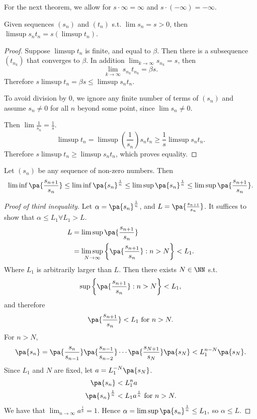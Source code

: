 \documentclass[11pt]{scrartcl}
\numberwithin{equation}{section}
\begin{document}
For the next theorem, we allow for $s\cdot\infty = \infty$
and $s \cdot (-\infty) = -\infty$.

\begin{theorem}
    Given sequences $(s_n)$ and $(t_n)$ s.t. 
    $\lim{s_n}=s>0$,
    then 
    $\limsup{s_nt_n} = s (\limsup t_n)$. 
\end{theorem}

\begin{proof}
    Suppose $\limsup t_n$ is finite, and equal to $\beta$.
    Then there is a subsequence $(t_{n_k})$ that converges to $\beta$.
    In addition $\lim_{k\rightarrow \infty}{s_{n_k}} = s$,
    then \[ \lim_{k\rightarrow \infty}{s_{n_k}t_{n_k}} = \beta s.\]
    Therefore $s\limsup t_n = \beta s\leq \limsup s_nt_n$.
    
    To avoid division by $0$, we ignore any finite number of terms of $(s_n)$ and 
    assume $s_n\neq 0$ for all $n$ beyond some point, since 
    $\lim s_n \neq 0$.

    Then $\lim \frac{1}{s_n} = \frac{1}{s}$. 
    \[ \limsup t_n = \limsup \left(\frac{1}{s_n}\right)s_nt_n \geq \frac{1}{s}\limsup s_nt_n. \]
    Therefore $s\limsup t_n \geq \limsup s_nt_n$, which proves equality.
\end{proof}
\begin{theorem}
    Let $(s_n)$ be any sequence of non-zero numbers. 
    Then 
    \[ \liminf \pa{\frac{s_{n+1}}{s_n}} \leq \liminf \pa{s_n}^{\frac{1}{n}}
    \leq \limsup \pa{s_n}^{\frac{1}{n}}\leq \limsup \pa{\frac{s_{n+1}}{s_n}}.\]
\end{theorem}
\begin{proof}
    [Proof of third inequality]
    Let $\alpha = \pa{s_n}^{\frac{1}{n}}$, and 
    $L = \pa{\frac{s_{n+1}}{s_n}}$.
    It suffices to show that $\alpha \leq L_1 \forall L_1>L.$
    \begin{align*}
        L &= \limsup \pa{\frac{s_{n+1}}{s_n}} \\
        &= \limsup_{N\rightarrow \infty}\left\{\pa{\frac{s_{n+1}}{s_n}} : n > N\right\} < L_1.
    \end{align*}
    Where $L_1$ is arbitrarily larger than $L$. 
    Then there exists $N\in\NN$ s.t. 
    \[ \sup \left\{\pa{\frac{s_{n+1}}{s_n}} : n > N\right\} < L_1,\]
    and therefore 
    \[ \pa{\frac{s_{n+1}}{s_n}} < L_1 \text{ for } n>N.\]
    For $n>N$, 
    \[ \pa{s_n} = \pa{\frac{s_{n}}{s_{n-1}}}\pa{\frac{s_{n-1}}{s_{n-2}}}
    \cdots \pa{\frac{s_{N+1}}{s_N}}\pa{s_N} < L_1^{n-N}\pa{s_N}.\]
    Since $L_1$ and $N$ are fixed, let $a = L_1^{-N}\pa{s_N}$.
    \begin{align*}
        \pa{s_n} &< L_1^na \\
        \pa{s_n}^{\frac{1}{n}} &< L_1a^{\frac{1}{n}} \text{ for } n > N.
    \end{align*}
    We have that $\lim_{n\rightarrow \infty}{a^{\frac{1}{n}}} =1$.
    Hence $\alpha= \limsup \pa{s_n}^{\frac{1}{n}}\leq L_1,$
    so $\alpha \leq L$.
\end{proof}
\end{document}
